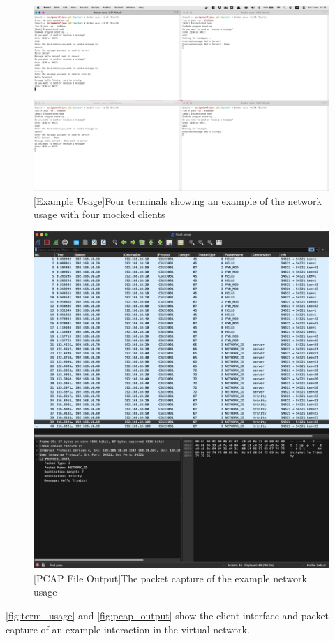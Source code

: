 \documentclass{article}
\begin{document}
\begin{figure}[!ht]
	\centering
	\begin{minipage}{.5\textwidth}
		\centering
		\includegraphics[width=0.8\linewidth]{term_usage.png}
		\captionsetup{width=.6\linewidth}
		[Example Usage]{Four terminals showing an example of the network usage with four mocked clients}
		\label{fig:term_usage}
	\end{minipage}%
	\begin{minipage}{.5\textwidth}
		\centering
		\includegraphics[width=0.8\linewidth]{pcap_output.png}
		\captionsetup{width=.6\linewidth}
		[PCAP File Output]{The packet capture of the example network usage}
		\label{fig:pcap_output}
	\end{minipage}
\end{figure}
\autoref{fig:term_usage} and \autoref{fig:pcap_output} show the client interface and packet capture of an example interaction in the virtual network.
\end{document}
